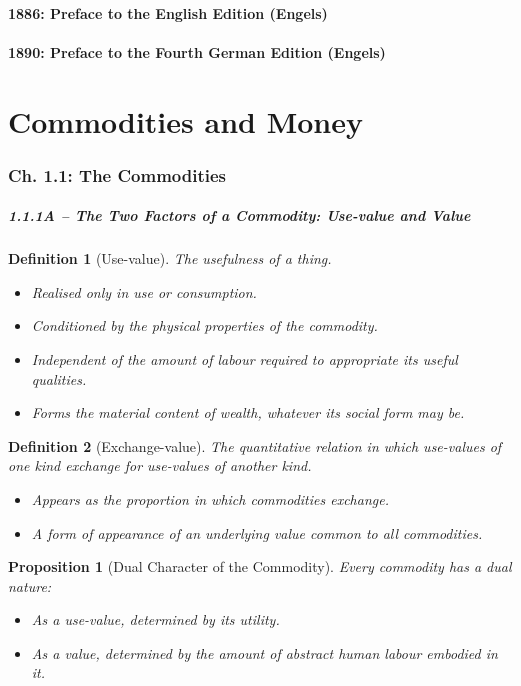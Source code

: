 \documentclass{article}
\newtheorem{definition}{Definition}[subsubsection]
\newtheorem{proposition}{Proposition}[subsubsection]
\newcommand{\customsubsubsection}[2]{%
  \subsubsection*{#1 -- #2}%
}
\begin{document}
\subsection*{1886: Preface to the English Edition (Engels)}
\subsection*{1890: Preface to the Fourth German Edition (Engels)}

\part{Commodities and Money}

\section{Ch. 1.1: The Commodities}

\customsubsubsection{1.1.1A}{The Two Factors of a Commodity: Use-value and Value}

\begin{definition}[Use-value]\label{def:1.1.1.1}
The usefulness of a thing.
\begin{itemize}[noitemsep]
  \item Realised only in use or consumption.
  \item Conditioned by the physical properties of the commodity.
  \item Independent of the amount of labour required to appropriate its useful qualities.
  \item Forms the material content of wealth, whatever its social form may be.
\end{itemize}
\end{definition}

\begin{definition}[Exchange-value]\label{def:1.1.1.2}
The quantitative relation in which use-values of one kind exchange for use-values of another kind.
\begin{itemize}[noitemsep]
  \item Appears as the proportion in which commodities exchange.
  \item A form of appearance of an underlying value common to all commodities.
\end{itemize}
\end{definition}

\begin{proposition}[Dual Character of the Commodity]\label{prop:1.1.1.1}
Every commodity has a dual nature:
\begin{itemize}[noitemsep]
  \item As a \textit{use-value}, determined by its utility.
  \item As a \textit{value}, determined by the amount of abstract human labour embodied in it.
\end{itemize}
\end{proposition}
\end{document}
